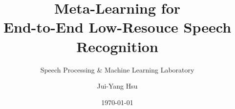 \documentclass{beamer}
\title{Meta-Learning for\\ End-to-End Low-Resouce Speech Recognition}
\subtitle{\textcolor[rgb]{0.00,0.50,1.00}{{Speech Processing \& Machine Learning Laboratory}}}
\author{Jui-Yang Hsu}
\date{\today}
\begin{document}
\begin{frame}
\maketitle
\end{frame}








\end{document}
